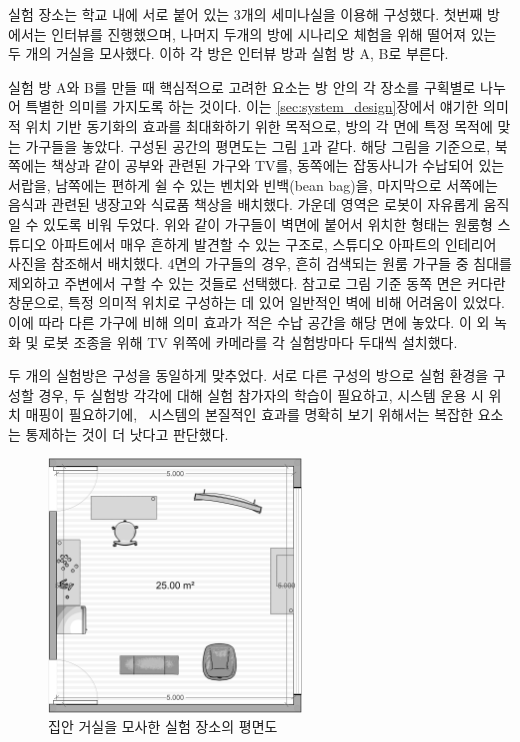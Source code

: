 
실험 장소는 학교 내에 서로 붙어 있는 3개의 세미나실을 이용해 구성했다. 첫번째 방에서는 인터뷰를 진행했으며, 나머지 두개의 방에 시나리오 체험을 위해 떨어져 있는 두 개의 거실을 모사했다. 이하 각 방은 인터뷰 방과 실험 방 A, B로 부른다.

실험 방 A와 B를 만들 때 핵심적으로 고려한 요소는 방 안의 각 장소를 구획별로 나누어 특별한 의미를 가지도록 하는 것이다. 이는 \ref{sec:system_design}장에서 얘기한 의미적 위치 기반 동기화의 효과를 최대화하기 위한 목적으로, 방의 각 면에 특정 목적에 맞는 가구들을 놓았다. 구성된 공간의 평면도는 그림 \ref{fig:floorplan}과 같다. 해당 그림을 기준으로, 북쪽에는 책상과 같이 공부와 관련된 가구와 TV를, 동쪽에는 잡동사니가 수납되어 있는 서랍을, 남쪽에는 편하게 쉴 수 있는 벤치와 빈백(bean bag)을, 마지막으로 서쪽에는 음식과 관련된 냉장고와 식료품 책상을 배치했다. 가운데 영역은 로봇이 자유롭게 움직일 수 있도록 비워 두었다. 위와 같이 가구들이 벽면에 붙어서 위치한 형태는 원룸형 스튜디오 아파트에서 매우 흔하게 발견할 수 있는 구조로, 스튜디오 아파트의 인테리어 사진을 참조해서 배치했다. 4면의 가구들의 경우, 흔히 검색되는 원룸 가구들 중 침대를 제외하고 주변에서 구할 수 있는 것들로 선택했다. 참고로 그림 기준 동쪽 면은 커다란 창문으로, 특정 의미적 위치로 구성하는 데 있어 일반적인 벽에 비해 어려움이 있었다. 이에 따라 다른 가구에 비해 의미 효과가 적은 수납 공간을 해당 면에 놓았다. 이 외 녹화 및 로봇 조종을 위해 TV 위쪽에 카메라를 각 실험방마다 두대씩 설치했다.

두 개의 실험방은 구성을 동일하게 맞추었다. 서로 다른 구성의 방으로 실험 환경을 구성할 경우, 두 실험방 각각에 대해 실험 참가자의 학습이 필요하고, 시스템 운용 시 위치 매핑이 필요하기에, \sysname\ 시스템의 본질적인 효과를 명확히 보기 위해서는 복잡한 요소는 통제하는 것이 더 낫다고 판단했다.


\begin{figure}
\centering
\includegraphics[width=0.6\textwidth]{images/floorplan}
\caption{집안 거실을 모사한 실험 장소의 평면도}
\label{fig:floorplan}
\end{figure}


